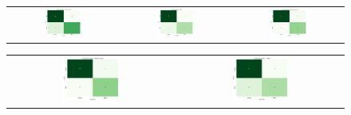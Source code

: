 \documentclass[pt]{article}  %
\begin{document}
\begin{figure}[H]
\begin{center}
\begin{tabular}{c c c} %
    \includegraphics[width=0.35\textwidth]{confusion-matrix/decision-tree.png} & %
    \includegraphics[width=0.35\textwidth]{confusion-matrix/knn.png} &
    \includegraphics[width=0.35\textwidth]{confusion-matrix/logistic.png} \\
\end{tabular}

\vspace{5pt} %

\begin{tabular}{c c} %
    \includegraphics[width=0.35\textwidth]{confusion-matrix/naive-bayes.png} &
    \includegraphics[width=0.35\textwidth]{confusion-matrix/svm.png} \\
\end{tabular}


\end{center}
\end{figure}
\end{document}
